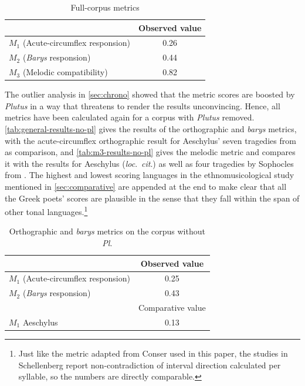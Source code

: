 \documentclass[twoside]{article}
\begin{document}
\begin{table}[ht]
    \centering
    \begin{tabular}{l c}
        \hline
                                             & Observed value \\
        \hline
         $M_1$ (Acute-circumflex responsion) & 0.26 \\
         $M_2$ (\textit{Barys} responsion)   & 0.44 \\
         $M_3$ (Melodic compatibility)       & 0.82 \\
         \hline
    \end{tabular}
    \caption{Full-corpus metrics}
    \label{tab:general-results}
\end{table}

The outlier analysis in \autoref{sec:chrono} showed that the metric scores are boosted by \textit{Plutus} in a way that threatens to render the results unconvincing. Hence, all metrics have been calculated again for a corpus with \textit{Plutus} removed. \autoref{tab:general-results-no-pl} gives the results of the orthographic and \textit{barys} metrics, with the acute-circumflex orthographic result for Aeschylus' seven tragedies from \textcite[265]{conserPitchAccentMelody2020} as comparison, and \autoref{tab:m3-results-no-pl} gives the melodic metric and compares it with the results for Aeschylus (\textit{loc}.\ \textit{cit}.) as well as four tragedies by Sophocles from \textcite[110]{conserAiolaNuxMusical2024}. The highest and lowest scoring languages in the ethnomusicological study \textcite[270]{schellenbergDoesLanguageDetermine2012} mentioned in \autoref{sec:comparative} are appended at the end to make clear that all the Greek poets' scores are plausible in the sense that they fall within the span of other tonal languages.\footnote{Just like the metric adapted from Conser used in this paper, the studies in Schellenberg report non-contradiction of interval direction calculated per syllable, so the numbers are directly comparable.}

\begin{table}[ht]
    \centering
    \begin{tabular}{l c}
        \hline
                                            & Observed value \\
        \hline
        $M_1$ (Acute-circumflex responsion) & 0.25 \\
        $M_2$ (\textit{Barys} responsion)   & 0.43 \\
        \hline
                                            & Comparative value \\
        \hline
        $M_1$ Aeschylus                     & 0.13 \\
        \hline
    \end{tabular}
    \caption{Orthographic and \textit{barys} metrics on the corpus without \textit{Pl}.}
    \label{tab:general-results-no-pl}
\end{table}
\end{document}
